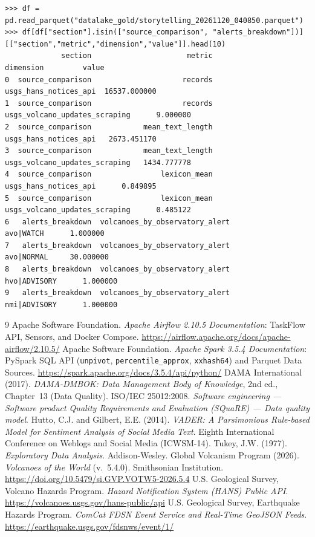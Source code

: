 \documentclass[11pt,a4paper]{article}
\begin{document}
\begin{lstlisting}[basicstyle=\tiny\ttfamily, caption={Excerpt of real Gold storytelling Parquet output (\texttt{datalake\_gold/storytelling\_20261120\_040850.parquet}, 6,041 rows total) inspected with pandas.}]
>>> df = pd.read_parquet("datalake_gold/storytelling_20261120_040850.parquet")
>>> df[df["section"].isin(["source_comparison", "alerts_breakdown"])][["section","metric","dimension","value"]].head(10)
             section                      metric                      dimension         value
0  source_comparison                     records          usgs_hans_notices_api  16537.000000
1  source_comparison                     records  usgs_volcano_updates_scraping      9.000000
2  source_comparison            mean_text_length          usgs_hans_notices_api   2673.451170
3  source_comparison            mean_text_length  usgs_volcano_updates_scraping   1434.777778
4  source_comparison                lexicon_mean          usgs_hans_notices_api      0.849895
5  source_comparison                lexicon_mean  usgs_volcano_updates_scraping      0.485122
6   alerts_breakdown  volcanoes_by_observatory_alert                      avo|WATCH      1.000000
7   alerts_breakdown  volcanoes_by_observatory_alert                     avo|NORMAL     30.000000
8   alerts_breakdown  volcanoes_by_observatory_alert                   hvo|ADVISORY      1.000000
9   alerts_breakdown  volcanoes_by_observatory_alert                   nmi|ADVISORY      1.000000
\end{lstlisting}

\begin{thebibliography}{9}
 Apache Software Foundation. \emph{Apache Airflow 2.10.5 Documentation}: TaskFlow API, Sensors, and Docker Compose. \url{https://airflow.apache.org/docs/apache-airflow/2.10.5/}
 Apache Software Foundation. \emph{Apache Spark 3.5.4 Documentation}: PySpark SQL API (\texttt{unpivot}, \texttt{percentile\_approx}, \texttt{xxhash64}) and Parquet Data Sources. \url{https://spark.apache.org/docs/3.5.4/api/python/}
 DAMA International (2017). \emph{DAMA-DMBOK: Data Management Body of Knowledge}, 2nd ed., Chapter~13 (Data Quality).
 ISO/IEC 25012:2008. \emph{Software engineering --- Software product Quality Requirements and Evaluation (SQuaRE) --- Data quality model}.
 Hutto, C.J. and Gilbert, E.E. (2014). \emph{VADER: A Parsimonious Rule-based Model for Sentiment Analysis of Social Media Text}. Eighth International Conference on Weblogs and Social Media (ICWSM-14).
 Tukey, J.W. (1977). \emph{Exploratory Data Analysis}. Addison-Wesley.
 Global Volcanism Program (2026). \emph{Volcanoes of the World} (v.~5.4.0). Smithsonian Institution. \url{https://doi.org/10.5479/si.GVP.VOTW5-2026.5.4}
 U.S. Geological Survey, Volcano Hazards Program. \emph{Hazard Notification System (HANS) Public API}. \url{https://volcanoes.usgs.gov/hans-public/api}
 U.S. Geological Survey, Earthquake Hazards Program. \emph{ComCat FDSN Event Service and Real-Time GeoJSON Feeds}. \url{https://earthquake.usgs.gov/fdsnws/event/1/}
\end{thebibliography}
\end{document}
